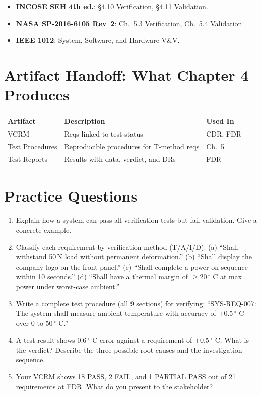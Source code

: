 \documentclass[11pt,letterpaper,twoside,openany]{book}
\begin{document}
\begin{keyconceptbox}
\begin{itemize}[nosep,leftmargin=1.5em]
\item \textbf{INCOSE SEH 4th ed.}: \S4.10 Verification, \S4.11 Validation.
\item \textbf{NASA SP-2016-6105 Rev~2}: Ch.~5.3 Verification, Ch.~5.4 Validation.
\item \textbf{IEEE 1012}: System, Software, and Hardware V\&V.
\end{itemize}
\end{keyconceptbox}

\section{Artifact Handoff: What Chapter 4 Produces}
\begin{table}[htbp]\centering\small
\begin{tabularx}{\textwidth}{l X l}
\toprule
\textbf{Artifact} & \textbf{Description} & \textbf{Used In} \\
\midrule
VCRM & Reqs linked to test status & CDR, FDR \\
Test Procedures & Reproducible procedures for T-method reqs & Ch.~5 \\
Test Reports & Results with data, verdict, and DRs & FDR \\
\bottomrule
\end{tabularx}
\end{table}

\section{Practice Questions}
\begin{enumerate}[leftmargin=1.5em]
\item Explain how a system can pass all verification tests but fail validation. Give a concrete example.
\item Classify each requirement by verification method (T/A/I/D): (a) ``Shall withstand 50\,N load without permanent deformation.'' (b) ``Shall display the company logo on the front panel.'' (c) ``Shall complete a power-on sequence within 10 seconds.'' (d) ``Shall have a thermal margin of $\geq$20\,$^{\circ}$ C at max power under worst-case ambient.''
\item Write a complete test procedure (all 9 sections) for verifying: ``SYS-REQ-007: The system shall measure ambient temperature with accuracy of $\pm$0.5\,$^{\circ}$ C over 0 to 50\,$^{\circ}$ C.''
\item A test result shows 0.6\,$^{\circ}$ C error against a requirement of $\pm$0.5\,$^{\circ}$ C. What is the verdict? Describe the three possible root causes and the investigation sequence.
\item Your VCRM shows 18 PASS, 2 FAIL, and 1 PARTIAL PASS out of 21 requirements at FDR. What do you present to the stakeholder?
\end{enumerate}
\end{document}

